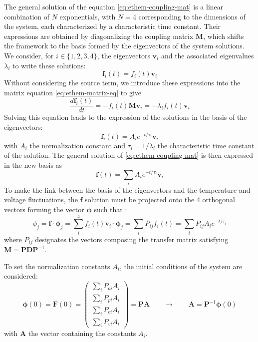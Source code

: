 The general solution of the equation \ref{eq:ethem-coupling-mat} is a linear combination of $N$ exponentials, with $N=4$ corresponding to the dimensions of the system, each characterized by a characteristic time constant. Their expressions are obtained by diagonalizing the coupling matrix $\bm{M}$, which shifts the framework to the basis formed by the eigenvectors of the system solutions. We consider, for $i \in \{1,2,3,4\}$, the eigenvectors $\bm{v}_i$ and the associated eigenvalues $\lambda_i$ to write these solutions:
\begin{equation}
\label{eq:eigen-solution}
\bm{f}_i(t) = f_i(t) \bm{v}_i
\end{equation}
Without considering the source term, we introduce these expressions into the matrix equation \ref{eq:ethem-matrix-eq} to give
\begin{equation}
\label{eq:eigen-solution-ode}
\frac{d \bm{f}_i(t)}{d t} = -f_i(t) \bm{M} \bm{v}_i = -\lambda_i f_i(t) \bm{v}_i
\end{equation}
Solving this equation leads to the expression of the solutions in the basis of the eigenvectors:
\begin{equation}
\bm{f}_i(t) = A_i e^{-t/\tau_i} \bm{v}_i
\end{equation}
with $A_i$ the normalization constant and $\tau_i=1/\lambda_i$ the characteristic time constant of the solution. The general solution of \ref{eq:ethem-coupling-mat} is then expressed in the new basis as
\begin{equation}
\label{eq:eigein-solution-expr}
\bm{f}(t) = \sum_i A_i e^{-t/\tau_i} \bm{v}_i
\end{equation}
To make the link between the basis of the eigenvectors and the temperature and voltage fluctuations, the $\bm{f}$ solution must be projected onto the 4 orthogonal vectors forming the vector $\bm{\phi}$ such that :
\begin{equation}
\label{eq:gen-solution}
\phi_j = \bm{f} \cdot \bm{\phi}_j = \sum_i^4 f_i(t) \bm{v}_i \cdot \bm{\phi}_j = \sum_i P_{ij} f_i(t) = \sum_i P_{ij} A_i e^{-t/\tau_i}
\end{equation}
where $P_{ij}$ designates the vectors composing the transfer matrix satisfying $\bm{M}=\bm{P} \bm{D} \bm{P}^{-1}$.

To set the normalization constants $A_i$, the initial conditions of the system are considered:
\begin{equation}
\bm{\phi}(0) = \bm{F}(0) =
\left( \begin{array}{c}
\sum_i P_{ai} A_i\\
\sum_i P_{pi} A_i\\
\sum_i P_{ei} A_i\\
\sum_i P_{vi} A_i
\end{array} \right) = \bm{P} \bm{A}
\qquad \longrightarrow \qquad \bm{A}=\bm{P}^{-1} \bm{\phi} (0)
\label{eq:ethem-initial-value}
\end{equation}
with $\bm{A}$ the vector containing the constants $A_i$.

